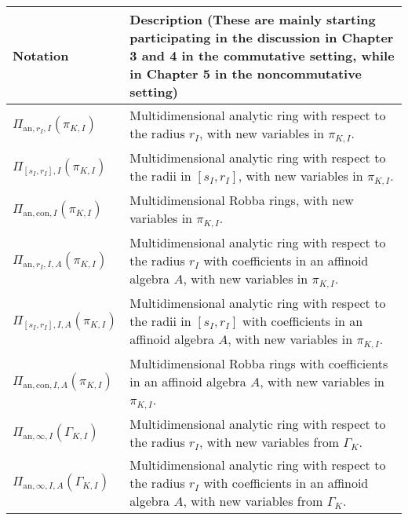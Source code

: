 \documentclass[12pt]{amsart}
\theoremstyle{definition}
\numberwithin{equation}{section}
\begin{document}
\begin{center}
\begin{tabularx}{\linewidth}{lX}
Notation & Description (These are mainly starting participating in the discussion in Chapter 3 and 4 in the commutative setting, while in Chapter 5 in the noncommutative setting)\\
\hline


$\Pi_{\mathrm{an},r_I,I}(\pi_{K,I})$ & Multidimensional analytic ring with respect to the radius $r_{I}$, with new variables in $\pi_{K,I}$.\\
$\Pi_{[s_I,r_I],I}(\pi_{K,I})$ & Multidimensional analytic ring with respect to the radii in $[s_I,r_{I}]$, with new variables in $\pi_{K,I}$.\\
$\Pi_{\mathrm{an},\mathrm{con},I}(\pi_{K,I})$ & Multidimensional Robba rings, with new variables in $\pi_{K,I}$.\\ 	
$\Pi_{\mathrm{an},r_I,I,A}(\pi_{K,I})$ & Multidimensional analytic ring with respect to the radius $r_{I}$ with coefficients in an affinoid algebra $A$, with new variables in $\pi_{K,I}$.\\
$\Pi_{[s_I,r_I],I,A}(\pi_{K,I})$ & Multidimensional analytic ring with respect to the radii in $[s_I,r_{I}]$ with coefficients in an affinoid algebra $A$, with new variables in $\pi_{K,I}$.\\
$\Pi_{\mathrm{an},\mathrm{con},I,A}(\pi_{K,I})$ & Multidimensional Robba rings with coefficients in an affinoid algebra $A$, with new variables in $\pi_{K,I}$.\\




 	
$\Pi_{\mathrm{an},\infty,I}(\Gamma_{K,I})$ & Multidimensional analytic ring with respect to the radius $r_{I}$, with new variables from $\Gamma_K$.\\






$\Pi_{\mathrm{an},\infty,I,A}(\Gamma_{K,I})$ & Multidimensional analytic ring with respect to the radius $r_{I}$ with coefficients in an affinoid algebra $A$, with new variables from $\Gamma_K$.\\








\end{tabularx}
\end{center}
\end{document}
